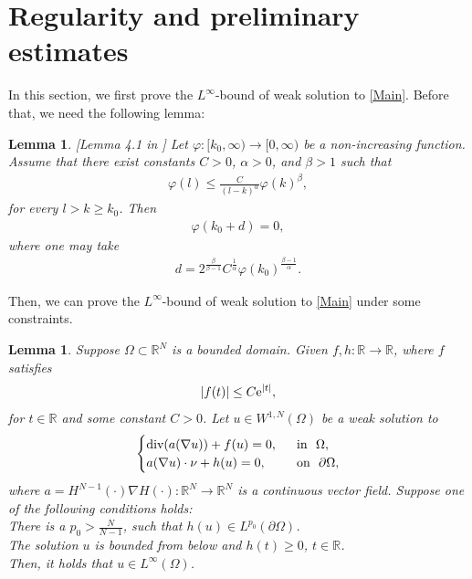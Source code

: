 \documentclass[reqno, 11pt]{amsart} %
\numberwithin{equation}{section}
\newtheorem{lemma}[thm]{Lemma}
\theoremstyle{definition}
\newcommand{\R}{\mathbb{R}}
\newcommand{\e}{\textup{e}}
\newcommand{\dt}{\textup{d}t}
\begin{document}
\section{Regularity and preliminary estimates}\label{sec:regularity}
In this section, we first prove the $L^{\infty}$-bound of weak solution to \eqref{Main}. Before that, we need the following lemma:

\begin{lemma}\label{iteration}\textup{[Lemma 4.1 in \cite{S1965}]}
    Let $\varphi:[k_0,\infty)\to[0,\infty)$ be a non-increasing function. Assume that there exist constants $C>0$, $\alpha>0$, and $\beta>1$ such that
    \begin{align*}
        \varphi(l) \leq \frac{C}{(l-k)^{\alpha}} \varphi(k)^{\beta},
    \end{align*}
    for every $l > k \geq k_0$. Then 
    \begin{align*}
        \varphi(k_0 + d) = 0,
    \end{align*}
    where one may take 
    \begin{align*}
        d  = 2^{\frac{\beta}{\beta -1}} C^{\frac{1}{\alpha}} \varphi(k_0)^{\frac{\beta -1}{\alpha}}.
    \end{align*}
\end{lemma}
Then, we can prove the $L^{\infty}$-bound of weak solution to \eqref{Main} under some constraints.

\begin{lemma}
    Suppose $\Omega \subset \R^N $ is a bounded domain. Given $f,h: \R \rightarrow \R$, where $f$ satisfies
    \begin{align*}
        |f(t)| \leq C \e^{|t|},%
    \end{align*}
    for $t \in \R$ and some constant $C>0$. Let $u \in W^{1,N}(\Omega)$ be a weak solution to
    \begin{equation}\label{Main3}
        \begin{cases}
            \textup{div} (a(\nabla u)) + f(u) =0, \ \ &\text{in} \ \ \Omega , \\
            a(\nabla u) \cdot \nu  + h(u)=0, \ \ &\text{on} \ \ \partial \Omega,
        \end{cases}
    \end{equation}
    where $a = H^{N-1}(\cdot)\nabla H(\cdot): \R^N \rightarrow \R^N$ is a continuous vector field. %
    Suppose one of the following conditions holds:\\
     There is a $p_0 > \frac{N}{N-1}$, such that $h(u) \in L^{p_0}(\partial \Omega)$. \\
     The solution $u$ is bounded from below and $h(t) \geq 0$, $t \in \R$.\\
    Then, it holds that $u \in L^{\infty}(\Omega)$.
\end{lemma}
\end{document}
